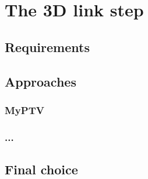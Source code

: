 \chapter{The 3D link step}
\label{chap:3dlink}

\section{Requirements}
\section{Approaches}
\subsection{MyPTV}
\subsection{...}
\section{Final choice}
